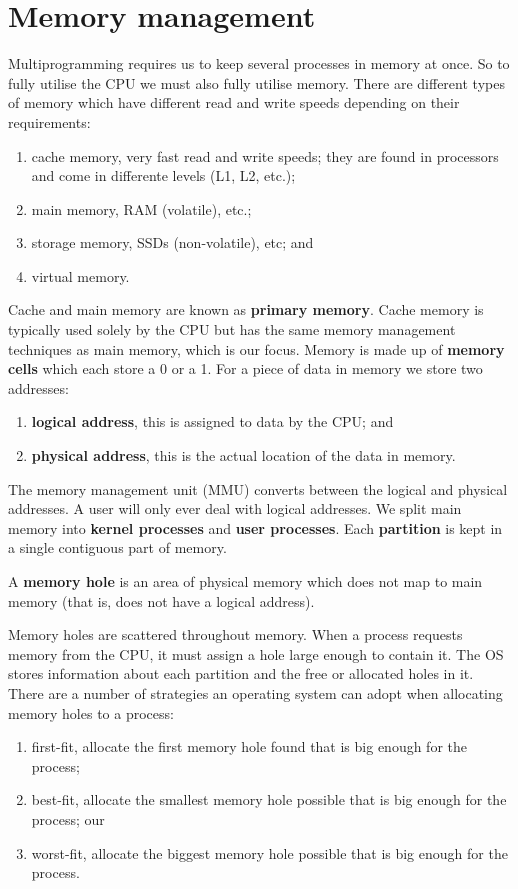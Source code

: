 \chapter{Memory management}

Multiprogramming requires us to keep several processes in memory at once. So to fully utilise the CPU we must also fully utilise memory. There are different types of memory which have different read and write speeds depending on their requirements:
\begin{enumerate}
    \item cache memory, very fast read and write speeds; they are found in processors and come in differente levels (L1, L2, etc.);
    \item main memory, RAM (volatile), etc.;
    \item storage memory, SSDs (non-volatile), etc; and
    \item virtual memory.
\end{enumerate}

Cache and main memory are known as \textbf{primary memory}. Cache memory is typically used solely by the CPU but has the same memory management techniques as main memory, which is our focus. Memory is made up of \textbf{memory cells} which each store a 0 or a 1. For a piece of data in memory we store two addresses:

\begin{enumerate}
    \item \textbf{logical address}, this is assigned to data by the CPU; and
    \item \textbf{physical address}, this is the actual location of the data in memory.
\end{enumerate}

The memory management unit (MMU) converts between the logical and physical addresses. A user will only ever deal with logical addresses. We split main memory into \textbf{kernel processes} and \textbf{user processes}. Each \textbf{partition} is kept in a single contiguous part of memory. 

\begin{definition}
    A \textbf{memory hole} is an area of physical memory which does not map to main memory (that is, does not have a logical address).
\end{definition}

Memory holes are scattered throughout memory. When a process requests memory from the CPU, it must assign a hole large enough to contain it. The OS stores information about each partition and the free or allocated holes in it. There are a number of strategies an operating system can adopt when allocating memory holes to a process:
\begin{enumerate}
    \item first-fit, allocate the first memory hole found that is big enough for the process;
    \item best-fit, allocate the smallest memory hole possible that is big enough for the process; our
    \item worst-fit, allocate the biggest memory hole possible that is big enough for the process.
\end{enumerate}

